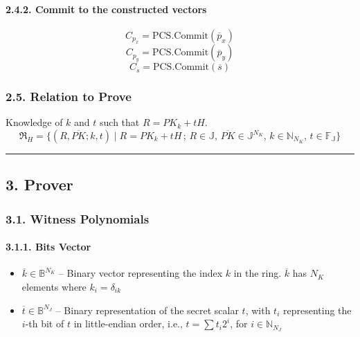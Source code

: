 \documentclass[
]{article}
\begin{document}
\hypertarget{commit-to-the-constructed-vectors}{%
\paragraph{2.4.2. Commit to the constructed
vectors}\label{commit-to-the-constructed-vectors}}

\[C_{p_x} = \text{PCS.Commit}(\overline{p}_x)\]
\[C_{p_y} = \text{PCS.Commit}(\overline{p}_y)\]
\[C_s = \text{PCS.Commit}(\overline{s})\]

\hypertarget{relation-to-prove}{%
\subsubsection{2.5. Relation to Prove}\label{relation-to-prove}}

Knowledge of \(k\) and \(t\) such that \(R = PK_k + tH\).
\[\mathfrak{R}_H = \{ (R, \overline{PK}; k, t) \mid R = PK_k + tH \,;\, R \in \mathbb{J}, \, \overline{PK} \in \mathbb{J}^{N_K}, \, k \in \mathbb{N}_{N_K}, \, t \in \mathbb{F_J} \}\]

\begin{center}\rule{0.5\linewidth}{0.5pt}\end{center}

\hypertarget{prover}{%
\subsection{3. Prover}\label{prover}}

\hypertarget{witness-polynomials}{%
\subsubsection{3.1. Witness Polynomials}\label{witness-polynomials}}

\hypertarget{bits-vector}{%
\paragraph{3.1.1. Bits Vector}\label{bits-vector}}

\begin{itemize}
\item
  \(\overline{k} \in \mathbb{B}^{N_K}\) -- Binary vector representing
  the index \(k\) in the ring. \(\overline{k}\) has \(N_K\) elements
  where \(k_i = \delta_{ik}\)
\item
  \(\overline{t} \in \mathbb{B}^{N_J}\) -- Binary representation of the
  secret scalar \(t\), with \(t_i\) representing the \(i\)-th bit of
  \(t\) in little-endian order, i.e., \(t = \sum t_i 2^i\), for
  \(i \in \mathbb{N}_{N_J}\)
\end{itemize}
\end{document}
